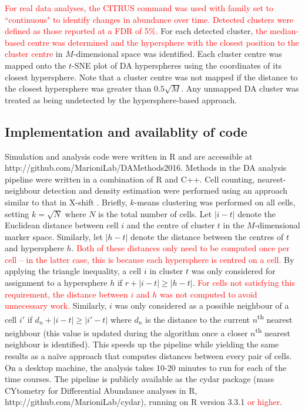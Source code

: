 \documentclass{article}
\newcommand\revised[1]{\textcolor{red}{#1}}
\begin{document}
\revised{For real data analyses, the CITRUS command was used with family set to ``continuous" to identify changes in abundance over time. 
    Detected clusters were defined as those reported at a FDR of 5\%.}
    For each detected cluster, \revised{the median-based centre was determined and the hypersphere with the closest position to the cluster centre} in $M$-dimensional space was identified.
Each cluster centre was mapped onto the $t$-SNE plot of DA hyperspheres using the coordinates of its closest hypersphere.
Note that a cluster centre was not mapped if the distance to the closest hypersphere was greater than $0.5\sqrt{M}$.
Any unmapped DA cluster was treated as being undetected by the hypersphere-based approach.

\subsection{Implementation and availablity of code}
Simulation and analysis code were written in R and are accessible at {http://\-github.com/\-MarioniLab/\-DAMethods2016}.
Methods in the DA analysis pipeline were written in a combination of R and C++.
Cell counting, nearest-neighbour detection and density estimation were performed using an approach similar to that in X-shift \cite{samusik2016automated}.
Briefly, $k$-means clustering was performed on all cells, setting $k=\sqrt{N}$ where $N$ is the total number of cells.
Let $|i-t|$ denote the Euclidean distance between cell $i$ and the centre of cluster $t$ in the $M$-dimensional marker space.
Similarly, let $|h-t|$ denote the distance between the centres of $t$ and hypersphere $h$. 
\revised{Both of these distances only need to be computed once per cell -- in the latter case, this is because each hypersphere is centred on a cell.}
By applying the triangle inequality, a cell $i$ in cluster $t$ was only considered for assignment to a hypersphere $h$ if $r + |i-t| \ge |h-t|$.
\revised{For cells not satisfying this requirement, the distance between $i$ and $h$ was not computed to avoid unnecessary work.}
Similarly, $i$ was only considered as a possible neighbour of a cell $i'$ if $d_n + |i-t| \ge |i'-t|$ where $d_n$ is the distance to the current $n$\textsuperscript{th} nearest neighbour (this value is updated during the algorithm once a closer $n$\textsuperscript{th} nearest neighbour is identified).
This speeds up the pipeline while yielding the same results as a na\"ive approach that computes distances between every pair of cells.
On a desktop machine, the analysis takes 10-20 minutes to run for each of the time courses.
The pipeline is publicly available as the cydar package (mass CYtometry for Differential Abundance analyses in R, http://\-github.com/\-MarioniLab/\-cydar), running on R version 3.3.1 \revised{or higher}.
\end{document}
